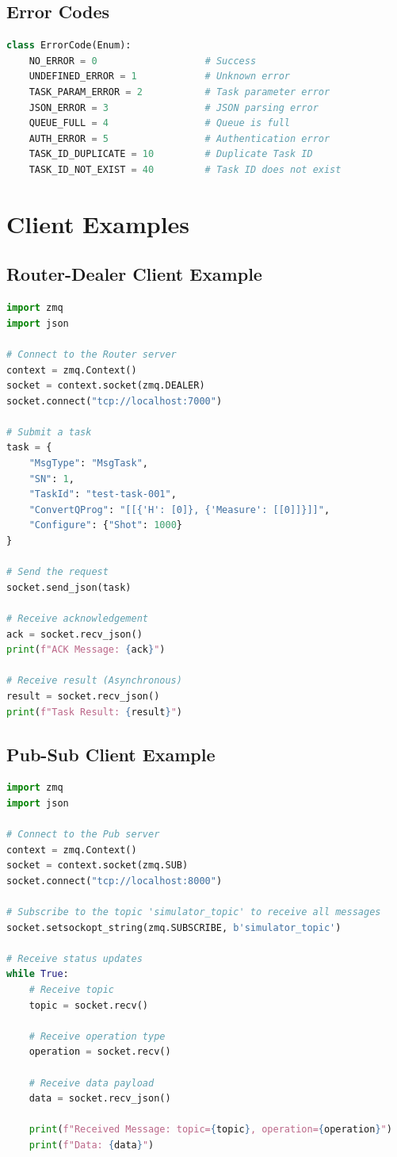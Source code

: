 \documentclass[UTF8, a4paper, 12pt]{article}
\begin{document}
\subsection{Error Codes}
\begin{lstlisting}[language=Python]
class ErrorCode(Enum):
    NO_ERROR = 0                   # Success
    UNDEFINED_ERROR = 1            # Unknown error
    TASK_PARAM_ERROR = 2           # Task parameter error
    JSON_ERROR = 3                 # JSON parsing error
    QUEUE_FULL = 4                 # Queue is full
    AUTH_ERROR = 5                 # Authentication error
    TASK_ID_DUPLICATE = 10         # Duplicate Task ID
    TASK_ID_NOT_EXIST = 40         # Task ID does not exist
\end{lstlisting}

\section{Client Examples}

\subsection{Router-Dealer Client Example}
\begin{lstlisting}[language=Python]
import zmq
import json

# Connect to the Router server
context = zmq.Context()
socket = context.socket(zmq.DEALER)
socket.connect("tcp://localhost:7000")

# Submit a task
task = {
    "MsgType": "MsgTask",
    "SN": 1,
    "TaskId": "test-task-001",
    "ConvertQProg": "[[{'H': [0]}, {'Measure': [[0]]}]]",
    "Configure": {"Shot": 1000}
}

# Send the request
socket.send_json(task)

# Receive acknowledgement
ack = socket.recv_json()
print(f"ACK Message: {ack}")

# Receive result (Asynchronous)
result = socket.recv_json()
print(f"Task Result: {result}")
\end{lstlisting}

\subsection{Pub-Sub Client Example}
\begin{lstlisting}[language=Python]
import zmq
import json

# Connect to the Pub server
context = zmq.Context()
socket = context.socket(zmq.SUB)
socket.connect("tcp://localhost:8000")

# Subscribe to the topic 'simulator_topic' to receive all messages
socket.setsockopt_string(zmq.SUBSCRIBE, b'simulator_topic')

# Receive status updates
while True:
    # Receive topic
    topic = socket.recv()
    
    # Receive operation type
    operation = socket.recv()
    
    # Receive data payload
    data = socket.recv_json()
    
    print(f"Received Message: topic={topic}, operation={operation}")
    print(f"Data: {data}")
\end{lstlisting}
\end{document}
